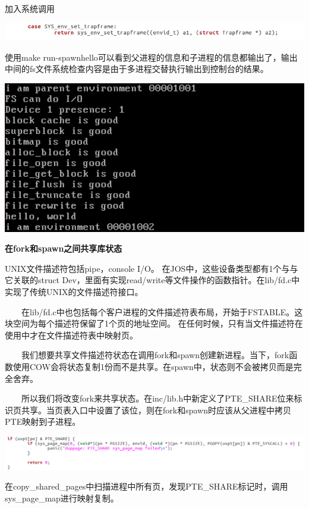 \begin{ExerciseList}
  加入系统调用

  \includegraphics[width=6in]{figures/lab5/image87.png}

  使用make run-spawnhello可以看到父进程的信息和子进程的信息都输出了，输出中间的fs文件系统检查内容是由于多进程交替执行输出到控制台的结果。

  \includegraphics[width=6in]{figures/lab5/image88.png}

  \textbf{在fork和spawn之间共享库状态}

  UNIX文件描述符包括pipe，console I/O。 在JOS中，这些设备类型都有1个与与它关联的struct Dev，里面有实现read/write等文件操作的函数指针。在lib/fd.c中实现了传统UNIX的文件描述符接口。

  　　在lib/fd.c中也包括每个客户进程的文件描述符表布局，开始于FSTABLE。这块空间为每个描述符保留了1个页的地址空间。 在任何时候，只有当文件描述符在使用中才在文件描述符表中映射页。

  　　我们想要共享文件描述符状态在调用fork和spawn创建新进程。当下，fork函数使用COW会将状态复制1份而不是共享。在spawn中，状态则不会被拷贝而是完全舍弃。

  　　所以我们将改变fork来共享状态。在inc/lib.h中新定义了PTE\_SHARE位来标识页共享。当页表入口中设置了该位，则在fork和spawn时应该从父进程中拷贝PTE映射到子进程。


  \includegraphics[width=6in]{figures/lab5/image90.png}

  在copy\_shared\_pages中扫描进程中所有页，发现PTE\_SHARE标记时，调用sys\_page\_map进行映射复制。


\end{ExerciseList}

